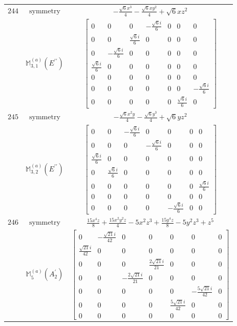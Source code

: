 \documentclass[fleqn,8pt,landscape]{jsarticle}
\begin{document}
\begin{longtable}{ccc}
$ 244 $ & $ \text{symmetry} $ & $ - \frac{\sqrt{6} x^{3}}{4} - \frac{\sqrt{6} x y^{2}}{4} + \sqrt{6} x z^{2} $ \\
$  $ & $ \mathbb{M}_{3,1}^{(a)}(E^{\prime\prime}) $ & $ \begin{bmatrix} 0 & 0 & 0 & - \frac{\sqrt{6} i}{6} & 0 & 0 & 0 \\ 0 & 0 & \frac{\sqrt{6} i}{6} & 0 & 0 & 0 & 0 \\ 0 & - \frac{\sqrt{6} i}{6} & 0 & 0 & 0 & 0 & 0 \\ \frac{\sqrt{6} i}{6} & 0 & 0 & 0 & 0 & 0 & 0 \\ 0 & 0 & 0 & 0 & 0 & 0 & 0 \\ 0 & 0 & 0 & 0 & 0 & 0 & - \frac{\sqrt{6} i}{6} \\ 0 & 0 & 0 & 0 & 0 & \frac{\sqrt{6} i}{6} & 0 \end{bmatrix} $ \\ \hline
$ 245 $ & $ \text{symmetry} $ & $ - \frac{\sqrt{6} x^{2} y}{4} - \frac{\sqrt{6} y^{3}}{4} + \sqrt{6} y z^{2} $ \\
$  $ & $ \mathbb{M}_{3,2}^{(a)}(E^{\prime\prime}) $ & $ \begin{bmatrix} 0 & 0 & - \frac{\sqrt{6} i}{6} & 0 & 0 & 0 & 0 \\ 0 & 0 & 0 & - \frac{\sqrt{6} i}{6} & 0 & 0 & 0 \\ \frac{\sqrt{6} i}{6} & 0 & 0 & 0 & 0 & 0 & 0 \\ 0 & \frac{\sqrt{6} i}{6} & 0 & 0 & 0 & 0 & 0 \\ 0 & 0 & 0 & 0 & 0 & 0 & \frac{\sqrt{6} i}{6} \\ 0 & 0 & 0 & 0 & 0 & 0 & 0 \\ 0 & 0 & 0 & 0 & - \frac{\sqrt{6} i}{6} & 0 & 0 \end{bmatrix} $ \\ \hline
$ 246 $ & $ \text{symmetry} $ & $ \frac{15 x^{4} z}{8} + \frac{15 x^{2} y^{2} z}{4} - 5 x^{2} z^{3} + \frac{15 y^{4} z}{8} - 5 y^{2} z^{3} + z^{5} $ \\
$  $ & $ \mathbb{M}_{5}^{(a)}(A_{2}^{\prime}) $ & $ \begin{bmatrix} 0 & - \frac{\sqrt{21} i}{42} & 0 & 0 & 0 & 0 & 0 \\ \frac{\sqrt{21} i}{42} & 0 & 0 & 0 & 0 & 0 & 0 \\ 0 & 0 & 0 & \frac{2 \sqrt{21} i}{21} & 0 & 0 & 0 \\ 0 & 0 & - \frac{2 \sqrt{21} i}{21} & 0 & 0 & 0 & 0 \\ 0 & 0 & 0 & 0 & 0 & - \frac{5 \sqrt{21} i}{42} & 0 \\ 0 & 0 & 0 & 0 & \frac{5 \sqrt{21} i}{42} & 0 & 0 \\ 0 & 0 & 0 & 0 & 0 & 0 & 0 \end{bmatrix} $ \\ \hline

\end{longtable}
\end{document}
